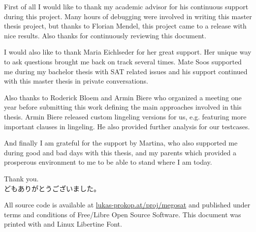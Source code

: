 \documentclass[11pt,a4paper,final,openright]{book}
\numberwithin{theorem}{chapter}
\numberwithin{defi}{chapter}
\numberwithin{prop}{chapter}
\begin{document}


\begin{acknowledgements}%
  \parskip5pt
  First of all I would like to thank my academic advisor for his continuous support
  during this project. Many hours of debugging were involved in writing this
  master thesis project, but thanks to Florian Mendel, this project came to a release
  with nice results. Also thanks for continuously reviewing this document.

  I would also like to thank Maria Eichlseder for her great support. Her unique
  way to ask questions brought me back on track several times.
  Mate Soos supported me during my bachelor thesis with SAT related issues
  and his support continued with this master thesis in private conversations.

  Also thanks to Roderick Bloem and Armin Biere who organized a meeting
  one year before submitting this work defining the main approaches involved
  in this thesis. Armin Biere released custom lingeling versions for us,
  e.g. featuring more important clauses in lingeling. He also provided further
  analysis for our testcases.

  And finally I am grateful for the support by Martina,
  who also supported me during good and bad days with this thesis,
  and my parents which provided a prosperous environment to me
  to be able to stand where I am today.

  Thank you. \\
  \indent どもありがとうございました。
\end{acknowledgements}

All source code is available at \href{http://lukas-prokop.at/proj/megosat}{lukas-prokop.at/proj/megosat}
and published under terms and conditions of Free/Libre Open Source Software.
This document was printed with \LuaLaTeX{} and Linux Libertine Font.


\tableofcontents
\mainmatter








\backmatter
\printindex
\printbibliography
\end{document}
